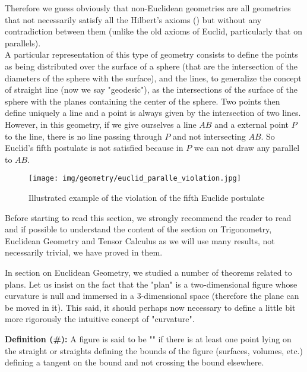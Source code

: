 	Therefore we guess obviously that non-Euclidean geometries are all geometries that not necessarily satisfy all the Hilbert's axioms () but without any contradiction between them (unlike the old axioms of Euclid, particularly that on parallels).\\
	
	A particular representation of this type of geometry consists to define the points as being distributed over the surface of a sphere (that are the intersection of the diameters of the sphere with the surface), and the lines, to generalize the concept of straight line (now we say "geodesic"), as the intersections of the surface of the sphere with the planes containing the center of the sphere. Two points then define uniquely a line and a point is always given by the intersection of two lines. However, in this geometry, if we give ourselves a line $AB$ and a external point $P$ to the line, there is no line passing through $P$ and not intersecting $AB$. So Euclid's fifth postulate is not satisfied because in $P$ we can not draw any parallel to $AB$.
	
	\begin{figure}[H]
		\centering
		\texttt{[image: img/geometry/euclid\_paralle\_violation.jpg]}
		\caption{Illustrated example of the violation of the fifth Euclide postulate}
	\end{figure}
	
	\begin{tcolorbox}[title=Remark,colframe=black,arc=10pt]
	Before starting to read this section, we strongly recommend the reader to read and if possible to understand the content of the section on Trigonometry, Euclidean Geometry and Tensor Calculus as we will use many results, not necessarily trivial, we have proved in them.
	\end{tcolorbox}
	
	In section on Euclidean Geometry, we studied a number of theorems related to plans. Let us insist on the fact that the "plan" is a two-dimensional figure whose curvature is null and immersed in a 3-dimensional space (therefore the plane can be moved in it). This said, it should perhaps now necessary to define a little bit more rigorously the intuitive concept of "curvature".
	
	\textbf{Definition (\#\mydef):}	A figure is said to be "" if there is at least one point lying on the straight or straights defining the bounds of the figure (surfaces, volumes, etc.) defining a tangent on the bound and not crossing the bound elsewhere.
	
